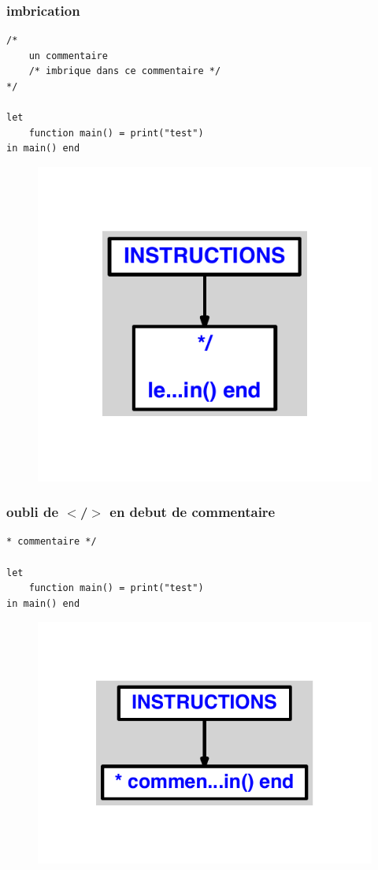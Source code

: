 \documentclass{article}
\begin{document}
\subsubsection{imbrication}
\begin{lstlisting}
/* 
	un commentaire
	/* imbrique dans ce commentaire */
*/

let
	function main() = print("test")
in main() end
\end{lstlisting}
\newpage
\begin{figure}[H]
\centering
\includegraphics[max width=\textwidth]{ast/ast_143.pdf}
\end{figure}
\newpage
\subsubsection{oubli de $ < $/$ > $ en debut de commentaire}
\begin{lstlisting}
* commentaire */

let
	function main() = print("test")
in main() end
\end{lstlisting}
\newpage
\begin{figure}[H]
\centering
\includegraphics[max width=\textwidth]{ast/ast_144.pdf}
\end{figure}
\newpage
\end{document}

